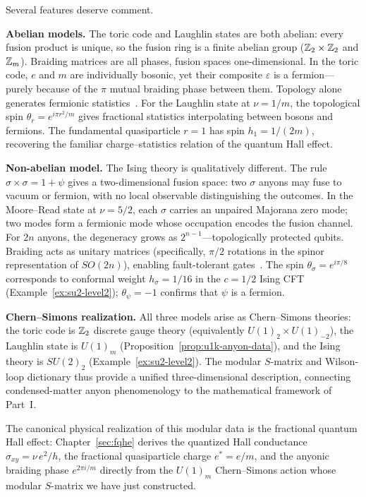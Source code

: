 \noindent
Several features deserve comment.

\medskip
\noindent\textbf{Abelian models.}
The toric code and Laughlin states are both abelian: every fusion product is
unique, so the fusion ring is a finite abelian group ($\mathbb{Z}_2 \times \mathbb{Z}_2$ and
$\mathbb{Z}_m$).  Braiding matrices are all phases, fusion spaces one-dimensional.
In the toric code, $e$ and $m$ are individually bosonic, yet their composite
$\varepsilon$ is a fermion---purely because of the $\pi$ mutual braiding phase
between them.  Topology alone generates fermionic
statistics~\cite{Kitaev2003FaultTolerant}.
For the Laughlin state at $\nu = 1/m$, the topological spin $\theta_r =
e^{i\pi r^2/m}$ gives fractional statistics interpolating between bosons and
fermions.  The fundamental quasiparticle $r = 1$ has spin $h_1 = 1/(2m)$,
recovering the familiar charge--statistics relation of the quantum Hall effect.

\medskip
\noindent\textbf{Non-abelian model.}
The Ising theory is qualitatively different.  The rule $\sigma \times \sigma =
1 + \psi$ gives a two-dimensional fusion space: two $\sigma$ anyons may fuse to
vacuum or fermion, with no local observable distinguishing the outcomes.  In the
Moore--Read state at $\nu = 5/2$, each $\sigma$ carries an unpaired Majorana
zero mode; two modes form a fermionic mode whose occupation encodes the fusion
channel.  For $2n$ anyons, the degeneracy grows as $2^{n-1}$---topologically
protected qubits.  Braiding acts as unitary matrices (specifically, $\pi/2$
rotations in the spinor representation of $SO(2n)$), enabling fault-tolerant
gates~\cite{NayakSimonSternFreedmanDasSarma2008NonabelianAnyons}.
The spin $\theta_\sigma = e^{i\pi/8}$ corresponds to conformal weight
$h_\sigma = 1/16$ in the $c = 1/2$ Ising CFT (Example~\ref{ex:su2-level2});
$\theta_\psi = -1$ confirms that $\psi$ is a fermion.

\medskip
\noindent\textbf{Chern--Simons realization.}
All three models arise as Chern--Simons theories: the toric code is $\mathbb{Z}_2$
discrete gauge theory (equivalently $U(1)_2 \times U(1)_{-2}$), the Laughlin
state is $U(1)_m$ (Proposition~\ref{prop:u1k-anyon-data}), and the Ising theory
is $SU(2)_2$ (Example~\ref{ex:su2-level2}).  The modular $S$-matrix and
Wilson-loop dictionary thus provide a unified three-dimensional description,
connecting condensed-matter anyon phenomenology to the mathematical framework of
Part~I.

\medskip

\noindent The canonical physical realization of this modular data is the fractional quantum Hall effect: Chapter~\ref{sec:fqhe} derives the quantized Hall conductance $\sigma_{xy} = \nu\, e^2/h$, the fractional quasiparticle charge $e^* = e/m$, and the anyonic braiding phase $e^{2\pi i/m}$ directly from the $U(1)_m$ Chern--Simons action whose modular $S$-matrix we have just constructed.
